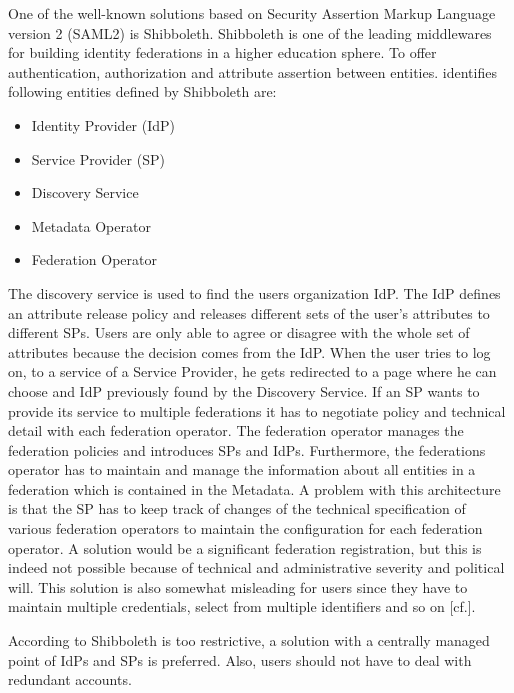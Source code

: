 One of the well-known solutions based on Security Assertion Markup Language version 2 (SAML2) is Shibboleth. Shibboleth is one of the leading middlewares for building identity federations in a higher education sphere. To offer authentication, authorization and attribute assertion between entities. \cite{Prochazka:2010:UCA} identifies following entities defined by Shibboleth are:

\begin{itemize}
	\item Identity Provider (IdP)
	\item Service Provider (SP)
	\item Discovery Service
	\item Metadata Operator
	\item Federation Operator
\end{itemize}

 The discovery service is used to find the users organization IdP. The IdP defines an attribute release policy and releases different sets of the user's attributes to different SPs. Users are only able to agree or disagree with the whole set of attributes because the decision comes from the IdP. When the user tries to log on, to a service of a Service Provider, he gets redirected to a page where he can choose and IdP previously found by the Discovery Service. If an SP wants to provide its service to multiple federations it has to negotiate policy and technical detail with each federation operator. The federation operator manages the federation policies and introduces SPs and IdPs. Furthermore, the federations operator has to maintain and manage the information about all entities in a federation which is contained in the Metadata. A problem with this architecture is that the SP has to keep track of changes of the technical specification of various federation operators to maintain the configuration for each federation operator. A solution would be a significant federation registration, but this is indeed not possible because of technical and administrative severity and political will. This solution is also somewhat misleading for users since they have to maintain multiple credentials, select from multiple identifiers and so on [cf.\cite{Prochazka:2010:UCA}].
 
 According to \cite{Prochazka:2010:UCA} Shibboleth is too restrictive, a solution with a centrally managed point of IdPs and SPs is preferred. Also, users should not have to deal with redundant accounts.





\chapterend